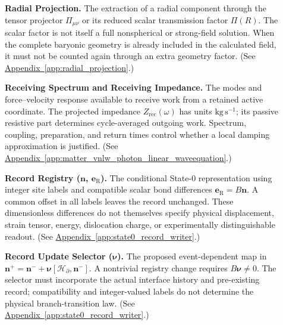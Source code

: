 \begin{description}
\item[] \begin{minipage}[t]{\linewidth}
\textbf{Radial Projection.} The extraction of a radial component through the tensor projector $\Pi_{\mu\nu}$ or its reduced scalar transmission factor $\Pi(R)$. The scalar factor is not itself a full nonspherical or strong-field solution. When the complete baryonic geometry is already included in the calculated field, it must not be counted again through an extra geometry factor.
(See \hyperref[app:radial_projection]{Appendix~\ref*{app:radial_projection}}.)
\end{minipage}

\item[] \begin{minipage}[t]{\linewidth}
\textbf{Receiving Spectrum and Receiving Impedance.} The modes and force--velocity response available to receive work from a retained active coordinate. The projected impedance $Z_{\mathrm{rec}}(\omega)$ has units $\mathrm{kg\,s^{-1}}$; its passive resistive part determines cycle-averaged outgoing work. Spectrum, coupling, preparation, and return times control whether a local damping approximation is justified.
(See \hyperref[app:matter_vnlw_photon_linear_waveequation]{Appendix~\ref*{app:matter_vnlw_photon_linear_waveequation}}.)
\end{minipage}

\item[] \begin{minipage}[t]{\linewidth}
\textbf{Record Registry ($\mathbf n$, $\mathbf e_{\mathrm R}$).} The conditional State-0 representation using integer site labels and compatible scalar bond differences $\mathbf e_{\mathrm R}=B\mathbf n$. A common offset in all labels leaves the record unchanged. These dimensionless differences do not themselves specify physical displacement, strain tensor, energy, dislocation charge, or experimentally distinguishable readout.
(See \hyperref[app:state0_record_writer]{Appendix~\ref*{app:state0_record_writer}}.)
\end{minipage}

\item[] \begin{minipage}[t]{\linewidth}
\textbf{Record Update Selector ($\boldsymbol\nu$).} The proposed event-dependent map in $\mathbf n^+=\mathbf n^-+\boldsymbol\nu[\mathcal H_\partial,\mathbf n^-]$. A nontrivial registry change requires $B\boldsymbol\nu\neq0$. The selector must incorporate the actual interface history and pre-existing record; compatibility and integer-valued labels do not determine the physical branch-transition law.
(See \hyperref[app:state0_record_writer]{Appendix~\ref*{app:state0_record_writer}}.)
\end{minipage}


\end{description}
